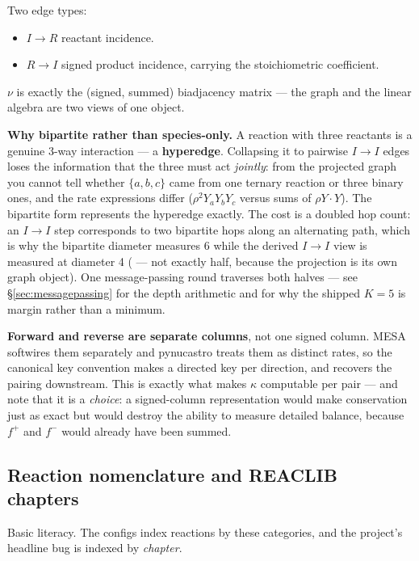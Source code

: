 Two edge types:

\begin{itemize}
\item \textbf{$I \to R$} reactant incidence.
\item \textbf{$R \to I$} signed product incidence, carrying the stoichiometric
      coefficient.
\end{itemize}

$\nu$ is exactly the (signed, summed) biadjacency matrix --- the graph and the
linear algebra are two views of one object.

\textbf{Why bipartite rather than species-only.} A reaction with three reactants
is a genuine 3-way interaction --- a \textbf{hyperedge}. Collapsing it to
pairwise $I\to I$ edges loses the information that the three must act
\emph{jointly}: from the projected graph you cannot tell whether $\{a,b,c\}$
came from one ternary reaction or three binary ones, and the rate expressions
differ ($\rho^2 Y_aY_bY_c$ versus sums of $\rho Y\cdot Y$). The bipartite form
represents the hyperedge exactly. The cost is a doubled hop count: an
$I\to I$ step corresponds to two bipartite hops along an alternating path, which
is why the bipartite diameter measures 6 while the derived $I\to I$ view is
measured at diameter 4 ( --- not exactly half, because the
projection is its own graph object). One message-passing round traverses both
halves --- see \S\ref{sec:messagepassing} for the depth arithmetic and for why
the shipped $K = 5$ is margin rather than a minimum.

\textbf{Forward and reverse are separate columns}, not one signed column. MESA
softwires them separately and pynucastro treats them as distinct rates, so the
canonical key convention makes a directed key per direction, and 
recovers the pairing downstream. This is exactly what makes $\kappa$ computable
per pair --- and note that it is a \emph{choice}: a signed-column representation
would make conservation just as exact but would destroy the ability to measure
detailed balance, because $f^+$ and $f^-$ would already have been summed.

\subsection{Reaction nomenclature and REACLIB chapters}
\label{sec:nomenclature}

Basic literacy. The configs index reactions by these categories, and the
project's headline bug is indexed by \emph{chapter}.

